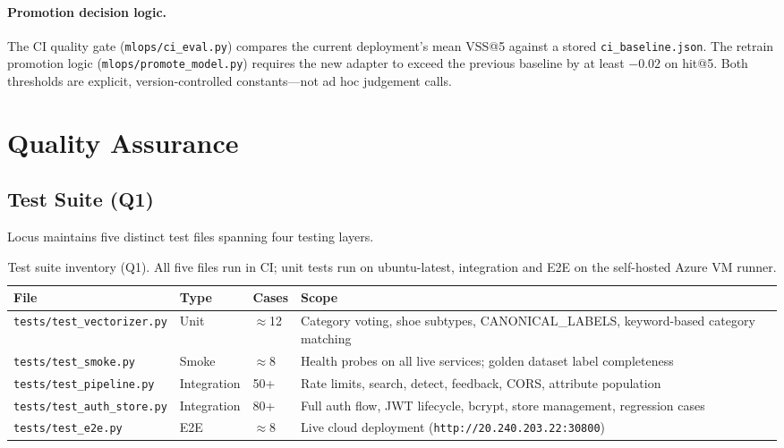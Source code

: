 \documentclass[12pt]{article}
\begin{document}
\paragraph{Promotion decision logic.}
The CI quality gate (\texttt{mlops/ci\_eval.py}) compares the current deployment's mean VSS@5 against a stored \texttt{ci\_baseline.json}. The retrain promotion logic (\texttt{mlops/promote\_model.py}) requires the new adapter to exceed the previous baseline by at least $-0.02$ on hit@5. Both thresholds are explicit, version-controlled constants---not ad hoc judgement calls.

\section{Quality Assurance}
\label{sec:qa}

\subsection{Test Suite (Q1)}

Locus maintains five distinct test files spanning four testing layers.

\begin{table}[H]
\centering
\small
\setlength{\tabcolsep}{4pt}
\begin{tabular}{@{} >{\RaggedRight\arraybackslash}p{4.5cm} l l >{\RaggedRight\arraybackslash}p{6.0cm} @{}}
\toprule
\textbf{File}                       & \textbf{Type} & \textbf{Cases} & \textbf{Scope} \\ \midrule
\texttt{tests/test\_vectorizer.py}  & Unit          & $\approx$12    & Category voting, shoe subtypes, CANONICAL\_LABELS, keyword-based category matching \\[2pt]
\texttt{tests/test\_smoke.py}       & Smoke         & $\approx$8     & Health probes on all live services; golden dataset label completeness \\[2pt]
\texttt{tests/test\_pipeline.py}    & Integration   & 50+            & Rate limits, search, detect, feedback, CORS, attribute population \\[2pt]
\texttt{tests/test\_auth\_store.py} & Integration   & 80+            & Full auth flow, JWT lifecycle, bcrypt, store management, regression cases \\[2pt]
\texttt{tests/test\_e2e.py}         & E2E           & $\approx$8     & Live cloud deployment (\texttt{http://20.240.203.22:30800}) \\ \bottomrule
\end{tabular}
\caption{Test suite inventory (Q1). All five files run in CI; unit tests run on ubuntu-latest, integration and E2E on the self-hosted Azure VM runner.}
\label{tab:tests}
\end{table}
\end{document}

